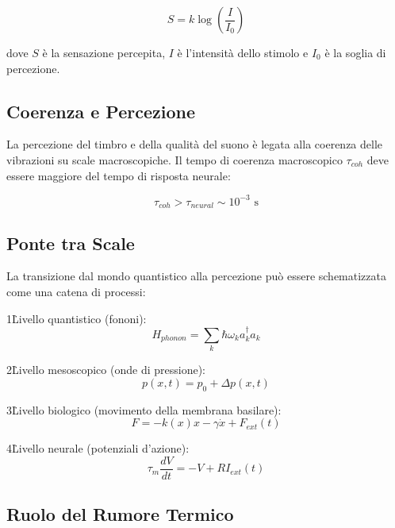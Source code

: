 \documentclass[a4paper,11pt]{article}
\begin{document}
\begin{equation}
S = k \log\left(\frac{I}{I_0}\right)
\end{equation}


dove $S$ è la sensazione percepita, $I$ è l'intensità dello stimolo e
$I_0$ è la soglia di percezione.

\subsection{Coerenza e Percezione}

La percezione del timbro e della qualità del suono è legata alla
coerenza delle vibrazioni su scale macroscopiche. Il tempo di coerenza
macroscopico $\tau_{coh}$ deve essere maggiore del tempo di risposta
neurale:

\begin{equation}
\tau_{coh} > \tau_{neural} \sim 10^{-3} \text{ s}
\end{equation}


\subsection{Ponte tra Scale}

La transizione dal mondo quantistico alla percezione può essere
schematizzata come una catena di processi:

1\. Livello quantistico (fononi):
\begin{equation}
H_{phonon} = \sum_k \hbar\omega_k a_k^\dagger a_k
\end{equation}


2\. Livello mesoscopico (onde di pressione):
\begin{equation}
p(x,t) = p_0 + \Delta p(x,t)
\end{equation}


3\. Livello biologico (movimento della membrana basilare):
\begin{equation}
F = -k(x)x - \gamma\dot{x} + F_{ext}(t)
\end{equation}


4\. Livello neurale (potenziali d'azione):
\begin{equation}
\tau_m\frac{dV}{dt} = -V + RI_{ext}(t)
\end{equation}


\subsection{Ruolo del Rumore Termico}
\end{document}

